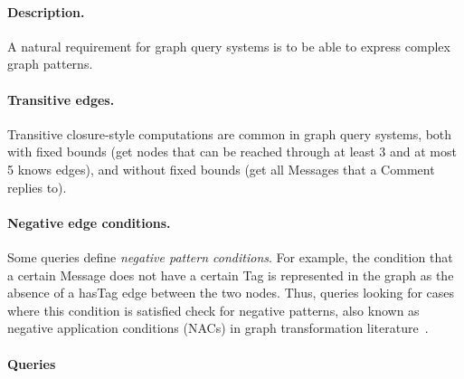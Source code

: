 
\paragraph{Description.}

A natural requirement for graph query systems is to be able to express complex
graph patterns.

\paragraph{Transitive edges.} Transitive closure-style computations are common
in graph query systems, both with fixed bounds (\eg get nodes that can be
reached through at least 3 and at most 5 \textsf{knows} edges), and without
fixed bounds (\eg get all \textsf{Messages} that a \textsf{Comment} replies to).

\paragraph{Negative edge conditions.} Some queries define \emph{negative pattern
conditions}. For example, the condition that a certain \textsf{Message} does not
have a certain \textsf{Tag} is represented in the graph as the absence of a
\textsf{hasTag} edge between the two nodes. Thus, queries looking for cases
where this condition is satisfied check for negative patterns, also known as
negative application conditions (NACs) in graph transformation
literature~\cite{DBLP:journals/fuin/HabelHT96}.


\paragraph{Queries}
{\raggedright
}